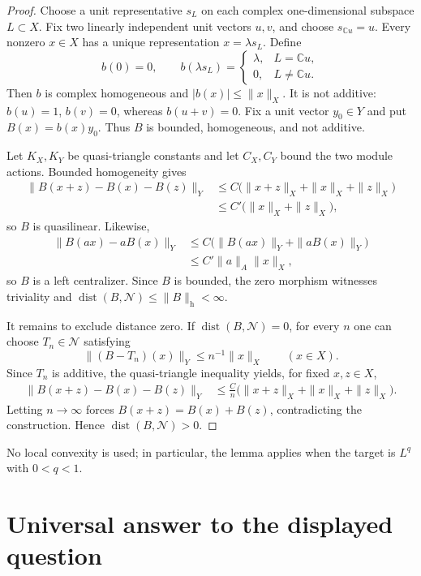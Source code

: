 \documentclass[11pt]{article}
\newcommand{\dist}{\operatorname{dist}}
\newcommand{\N}{\mathscr N}
\begin{document}
\begin{proof}
Choose a unit representative $s_L$ on each complex one-dimensional subspace
$L\subset X$.  Fix two linearly independent unit vectors $u,v$, and choose
$s_{\mathbb Cu}=u$.  Every nonzero $x\in X$ has a unique representation
$x=\lambda s_L$.  Define
\[
 b(0)=0,\qquad
 b(\lambda s_L)=
 \begin{cases}
   \lambda,&L=\mathbb Cu,\\
   0,&L\ne\mathbb Cu.
 \end{cases}
\]
Then $b$ is complex homogeneous and $|b(x)|\leq\|x\|_X$.  It is not additive:
$b(u)=1$, $b(v)=0$, whereas $b(u+v)=0$.  Fix a unit vector $y_0\in Y$ and put
$B(x)=b(x)y_0$.  Thus $B$ is bounded, homogeneous, and not additive.

Let $K_X,K_Y$ be quasi-triangle constants and let $C_X,C_Y$ bound the two
module actions.  Bounded homogeneity gives
\begin{align*}
 \|B(x+z)-B(x)-B(z)\|_Y
 &\leq C\bigl(\|x+z\|_X+\|x\|_X+\|z\|_X\bigr)\\
 &\leq C'\bigl(\|x\|_X+\|z\|_X\bigr),
\end{align*}
so $B$ is quasilinear.  Likewise,
\begin{align*}
 \|B(ax)-aB(x)\|_Y
 &\leq C\bigl(\|B(ax)\|_Y+\|aB(x)\|_Y\bigr)\\
 &\leq C'\|a\|_A\|x\|_X,
\end{align*}
so $B$ is a left centralizer.  Since $B$ is bounded, the zero morphism
witnesses triviality and $\dist(B,\N)\leq\|B\|_{\mathrm h}<\infty$.

It remains to exclude distance zero.  If $\dist(B,\N)=0$, for every $n$ one
can choose $T_n\in\N$ satisfying
\[
 \|(B-T_n)(x)\|_Y\leq n^{-1}\|x\|_X\qquad(x\in X).
\]
Since $T_n$ is additive, the quasi-triangle inequality yields, for fixed
$x,z\in X$,
\begin{align*}
 \|B(x+z)-B(x)-B(z)\|_Y
 &\leq \frac{C}{n}
  \bigl(\|x+z\|_X+\|x\|_X+\|z\|_X\bigr).
\end{align*}
Letting $n\to\infty$ forces $B(x+z)=B(x)+B(z)$, contradicting the
construction.  Hence $\dist(B,\N)>0$.
\end{proof}

No local convexity is used; in particular, the lemma applies when the target
is $L^q$ with $0<q<1$.

\section{Universal answer to the displayed question}
\end{document}
